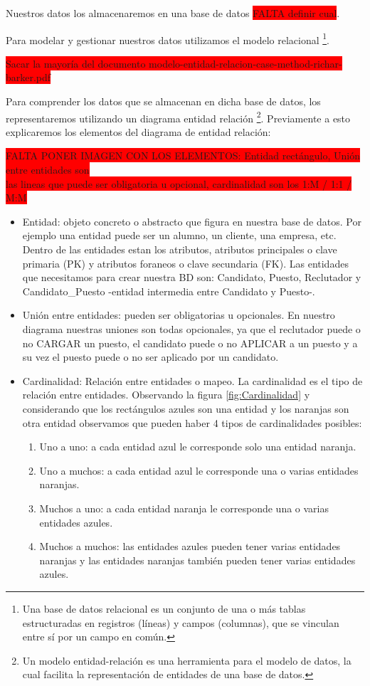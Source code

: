 \documentclass[12pt,a4paper]{article}
\begin{document}
\begin{sloppypar}
Nuestros datos los almacenaremos en una base de datos \colorbox{red}{FALTA definir cual}. 

Para modelar y gestionar nuestros datos utilizamos el modelo relacional \footnote{Una base de datos relacional es un conjunto de una o más tablas estructuradas en registros (líneas) y campos (columnas), que se vinculan entre sí por un campo en común.}.

\colorbox{red}{Sacar la mayoría del documento modelo-entidad-relacion-case-method-richar-barker.pdf} 

Para comprender los datos que se almacenan en dicha base de datos, los representaremos utilizando un diagrama entidad relación \footnote{Un modelo entidad-relación es una herramienta para el modelo de datos, la cual facilita la representación de entidades de una base de datos.}.
Previamente a esto explicaremos los elementos del diagrama de entidad relación: 

\colorbox{red}{FALTA PONER IMAGEN CON LOS ELEMENTOS: Entidad rectángulo, Unión entre entidades son} \\ \colorbox{red}{las lineas que puede ser obligatoria u opcional, cardinalidad son los 1:M / 1:1 / M:M}

\begin{itemize}
\item Entidad: objeto concreto o abstracto que figura en nuestra base de datos. Por ejemplo una entidad puede ser un alumno, un cliente, una empresa, etc. Dentro de las entidades estan los atributos, atributos principales o clave primaria (PK) y atributos foraneos o clave secundaria (FK).  Las entidades que necesitamos para crear nuestra BD son: Candidato, Puesto, Reclutador y Candidato\_Puesto -entidad intermedia entre Candidato y Puesto-.
\item Unión entre entidades: pueden ser obligatorias u opcionales. En nuestro diagrama nuestras uniones son todas opcionales, ya que el reclutador puede o no CARGAR un puesto, el candidato puede o no APLICAR a un puesto y a su vez el puesto puede o no ser aplicado por un candidato. 
\item Cardinalidad: Relación entre entidades o mapeo. La cardinalidad es el tipo de relación entre entidades. Observando la figura \ref{fig:Cardinalidad} y considerando que los rectángulos azules son una entidad y los naranjas son otra entidad observamos que pueden haber 4 tipos de cardinalidades posibles:

\begin{enumerate}
\item Uno a uno: a cada entidad azul le corresponde solo una entidad naranja.
\item Uno a muchos: a cada entidad azul le corresponde una o varias entidades naranjas.
\item Muchos a uno: a cada entidad naranja le corresponde una o varias entidades azules.
\item Muchos a muchos: las entidades azules pueden tener varias entidades naranjas y las entidades naranjas también pueden tener varias entidades azules.
\end{enumerate}
\end{itemize}


\end{sloppypar}
\end{document}
